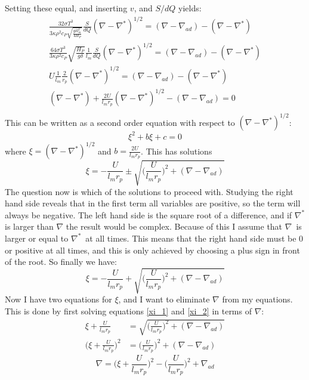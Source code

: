 \documentclass[a4paper,12pt]{article}
\begin{document}
Setting these equal, and inserting $v$, and $S/dQ$ yields:
\begin{equation*}
 \begin{aligned}
  \frac{32\sigma T^3}{3\kappa\rho^2 c_P \sqrt{\frac{g\delta l_m^2}{4H_P}}}\frac{S}{dQ}(\nabla - \nabla^*)^{1/2} = (\nabla -\nabla_{ad} ) - (\nabla - \nabla^* )\\
  \frac{64\sigma T^3}{3\kappa\rho^2 c_P}\sqrt{\frac{H_P}{g\delta}} \frac{1}{l_m}\frac{S}{dQ}(\nabla - \nabla^*)^{1/2} = (\nabla -\nabla_{ad} ) - (\nabla - \nabla^* )\\
  U \frac{1}{l_m}\frac{2}{r_p}(\nabla - \nabla^*)^{1/2} = (\nabla -\nabla_{ad} ) - (\nabla - \nabla^* )\\
  (\nabla - \nabla^* ) + \frac{2U}{l_m r_p}(\nabla - \nabla^*)^{1/2} - (\nabla -\nabla_{ad} ) = 0 \\
   \end{aligned}
\end{equation*}
This can be written as a second order equation with respect to $(\nabla - \nabla^*)^{1/2}$:
\begin{equation*}
 \xi^2 + b\xi + c = 0 
\end{equation*}
where $\xi = (\nabla - \nabla^*)^{1/2}$ and $b= \frac{2U}{l_m r_p}$. This has solutions
\begin{equation*}
 \xi = -\frac{U}{l_m r_p} \pm \sqrt{\bigg(\frac{U}{l_m r_p}\bigg)^2 + (\nabla - \nabla_{ad})}
\end{equation*}
The question now is which of the solutions to proceed with. Studying the right hand side reveals that in the first term all variables are positive, so the term will always be negative. The left hand side is the square root of a difference, and if $\nabla^*$ is larger than $\nabla$ the result would be complex. Because of this I assume that $\nabla$ is larger or equal to $\nabla^*$ at all times. This means that the right hand side must be $0$ or positive at all times, and this is only achieved by choosing a plus sign in front of the root. So finally we have:
\begin{equation}
 \xi = -\frac{U}{l_m r_p} + \sqrt{\bigg(\frac{U}{l_m r_p}\bigg)^2 + (\nabla - \nabla_{ad})}
 \label{xi_2}
\end{equation}
Now I have two equations for $\xi$, and I want to eliminate $\nabla$ from my equations. 
This is done by first solving equations \ref{xi_1} and \ref{xi_2} in terms of $\nabla$:
\begin{equation*}
\begin{aligned}
 \xi + \frac{U}{l_m r_p} &= \sqrt{\bigg(\frac{U}{l_m r_p}\bigg)^2 + (\nabla - \nabla_{ad})}\\
 \bigg(\xi + \frac{U}{l_m r_p}\bigg)^2 &= \bigg(\frac{U}{l_m r_p}\bigg)^2 + (\nabla - \nabla_{ad})
\end{aligned}
\end{equation*}
\begin{equation}
 \nabla = \bigg(\xi + \frac{U}{l_m r_p}\bigg)^2 - \bigg(\frac{U}{l_m r_p}\bigg)^2 +  \nabla_{ad}
\end{equation}
\end{document}
